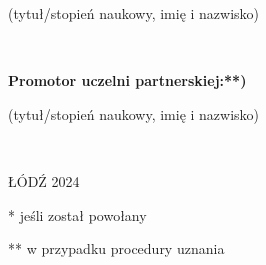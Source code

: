 \begin{centering}
(tytuł/stopień naukowy, imię i nazwisko)

~\\

\end{centering}
\textbf{Promotor uczelni partnerskiej:**)} \dotfill

\begin{centering}
(tytuł/stopień naukowy, imię i nazwisko)

~\\

\end{centering}

\vfill

\begin{centering}
ŁÓDŹ 2024\\

\end{centering}

*	jeśli został powołany

**	w przypadku procedury uznania
